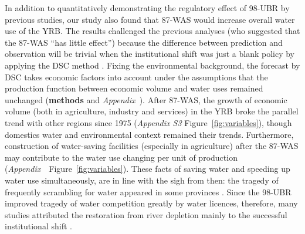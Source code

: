 
\label{discussion-1}
In addition to quantitatively demonstrating the regulatory effect of 98-UBR by previous studies, our study also found that 87-WAS would increase overall water use of the YRB.
The results challenged the previous analyses (who suggested that the 87-WAS ``has little effect'') because the difference between prediction and observation will be trivial when the institutional shift was just a blank policy by applying the DSC method \cite{abadie2015,hill2021}.
Fixing the environmental background, the forecast by DSC takes economic factors into account under the assumptions that the production function between economic volume and water uses remained unchanged (\textbf{methods} and \textit{Appendix~}).
After 87-WAS, the growth of economic volume (both in agriculture, industry and services) in the YRB broke the parallel trend with other regions since 1975 (\textit{Appendix S3} Figure~\ref{fig:variables}), though domestics water and environmental context remained their trends.
Furthermore, construction of water-saving facilities (especially in agriculture) after the 87-WAS may contribute to the water use changing per unit of production (\textit{Appendix~}~Figure~\ref{fig:variables}).
These facts of saving water and speeding up water use simultaneously, are in line with the sigh from then: the tragedy of frequently scrambling for water appeared in some provinces \cite{mao2000}.
Since the 98-UBR improved tragedy of water competition greatly by water licences, therefore, many studies attributed the restoration from river depletion mainly to the successful institutional shift \cite{chen2021,huangang2002,an2007}.

